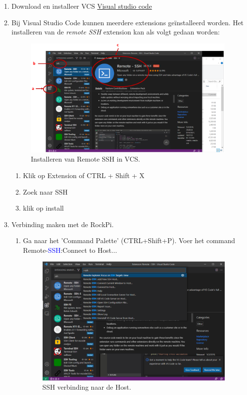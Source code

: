 \begin{enumerate}
	\item Download en installeer VCS \href{https://code.visualstudio.com/docs}{Visual studio code}
	\item Bij Visual Studio Code kunnen meerdere extensions geïnstalleerd worden. Het installeren van de \textit{remote SSH} extension kan als volgt gedaan worden:
	\begin{figure}[h!]
	\captionsetup{justification=centering}
	\includegraphics[width=0.6 \linewidth]{figuren/vcsExtSSH}
	\centering
	\caption{Installeren van Remote SSH in VCS.}
	\label{fig:vscEx}
\end{figure}


	\begin{enumerate}
		\item Klik op Extension  of CTRL + Shift + X
		\item Zoek naar SSH
		\item klik op install
	\end{enumerate}
    \item Verbinding maken met de RockPi.
	\begin{enumerate}
	    \item Ga naar het 'Command Palette' (CTRL+Shift+P). Voer het command Remote-\textcolor{blue}{SSH}:Connect to Host...
	    \begin{figure}[h!]
		\captionsetup{justification=centering}
		\includegraphics[width=0.6 \linewidth]{figuren/VNCremoteSSH}
		\centering
		\caption{SSH verbinding naar de Host.}
		\label{fig:vscConnect}
	\end{figure}


\end{enumerate}
\end{enumerate}

